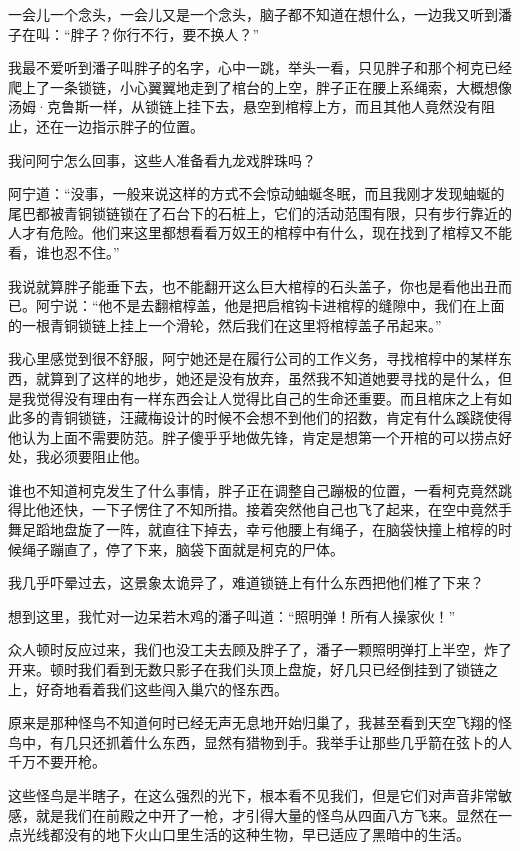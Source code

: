 一会儿一个念头，一会儿又是一个念头，脑子都不知道在想什么，一边我又听到潘子在叫：“胖子？你行不行，要不换人？”

我最不爱听到潘子叫胖子的名字，心中一跳，举头一看，只见胖子和那个柯克已经爬上了一条锁链，小心翼翼地走到了棺台的上空，胖子正在腰上系绳索，大概想像汤姆·克鲁斯一样，从锁链上挂下去，悬空到棺椁上方，而且其他人竟然没有阻止，还在一边指示胖子的位置。

我问阿宁怎么回事，这些人准备看九龙戏胖珠吗？

阿宁道：“没事，一般来说这样的方式不会惊动蚰蜒冬眠，而且我刚才发现蚰蜒的尾巴都被青铜锁链锁在了石台下的石桩上，它们的活动范围有限，只有步行靠近的人才有危险。他们来这里都想看看万奴王的棺椁中有什么，现在找到了棺椁又不能看，谁也忍不住。”

我说就算胖子能垂下去，也不能翻开这么巨大棺椁的石头盖子，你也是看他出丑而已。阿宁说：“他不是去翻棺椁盖，他是把启棺钩卡进棺椁的缝隙中，我们在上面的一根青铜锁链上挂上一个滑轮，然后我们在这里将棺椁盖子吊起来。”

我心里感觉到很不舒服，阿宁她还是在履行公司的工作义务，寻找棺椁中的某样东西，就算到了这样的地步，她还是没有放弃，虽然我不知道她要寻找的是什么，但是我觉得没有理由有一样东西会让人觉得比自己的生命还重要。而且棺床之上有如此多的青铜锁链，汪藏梅设计的时候不会想不到他们的招数，肯定有什么蹊跷使得他认为上面不需要防范。胖子傻乎乎地做先锋，肯定是想第一个开棺的可以捞点好处，我必须要阻止他。

谁也不知道柯克发生了什么事情，胖子正在调整自己蹦极的位置，一看柯克竟然跳得比他还快，一下子愣住了不知所措。接着突然他自己也飞了起来，在空中竟然手舞足蹈地盘旋了一阵，就直往下掉去，幸亏他腰上有绳子，在脑袋快撞上棺椁的时候绳子蹦直了，停了下来，脑袋下面就是柯克的尸体。

我几乎吓晕过去，这景象太诡异了，难道锁链上有什么东西把他们椎了下来？

想到这里，我忙对一边呆若木鸡的潘子叫道：“照明弹！所有人操家伙！”

众人顿时反应过来，我们也没工夫去顾及胖子了，潘子一颗照明弹打上半空，炸了开来。顿时我们看到无数只影子在我们头顶上盘旋，好几只已经倒挂到了锁链之上，好奇地看着我们这些闯入巢穴的怪东西。

原来是那种怪鸟不知道何时已经无声无息地开始归巢了，我甚至看到天空飞翔的怪鸟中，有几只还抓着什么东西，显然有猎物到手。我举手让那些几乎箭在弦卜的人千万不要开枪。

这些怪鸟是半瞎子，在这么强烈的光下，根本看不见我们，但是它们对声音非常敏感，就是我们在前殿之中开了一枪，才引得大量的怪鸟从四面八方飞来。显然在一点光线都没有的地下火山口里生活的这种生物，早已适应了黑暗中的生活。

